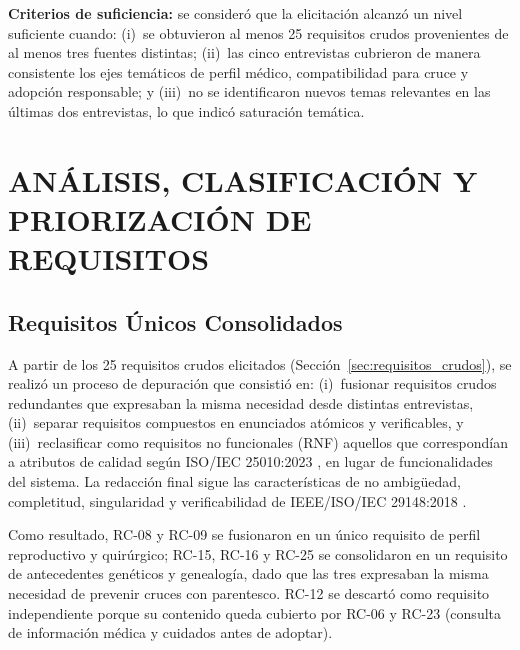 \textbf{Criterios de suficiencia:} se consideró que la elicitación alcanzó un nivel suficiente cuando: (i)~se obtuvieron al menos 25 requisitos crudos provenientes de al menos tres fuentes distintas; (ii)~las cinco entrevistas cubrieron de manera consistente los ejes temáticos de perfil médico, compatibilidad para cruce y adopción responsable; y (iii)~no se identificaron nuevos temas relevantes en las últimas dos entrevistas, lo que indicó saturación temática.

\newpage

\section{ANÁLISIS, CLASIFICACIÓN Y PRIORIZACIÓN DE REQUISITOS}

\subsection{Requisitos Únicos Consolidados}

A partir de los 25 requisitos crudos elicitados (Sección~\ref{sec:requisitos_crudos}), se realizó un proceso de depuración que consistió en: (i)~fusionar requisitos crudos redundantes que expresaban la misma necesidad desde distintas entrevistas, (ii)~separar requisitos compuestos en enunciados atómicos y verificables, y (iii)~reclasificar como requisitos no funcionales (RNF) aquellos que correspondían a atributos de calidad según ISO/IEC 25010:2023 \cite{iso25010}, en lugar de funcionalidades del sistema. La redacción final sigue las características de no ambigüedad, completitud, singularidad y verificabilidad de IEEE/ISO/IEC 29148:2018 \cite{ieee29148}.

Como resultado, RC-08 y RC-09 se fusionaron en un único requisito de perfil reproductivo y quirúrgico; RC-15, RC-16 y RC-25 se consolidaron en un requisito de antecedentes genéticos y genealogía, dado que las tres expresaban la misma necesidad de prevenir cruces con parentesco. RC-12 se descartó como requisito independiente porque su contenido queda cubierto por RC-06 y RC-23 (consulta de información médica y cuidados antes de adoptar).

